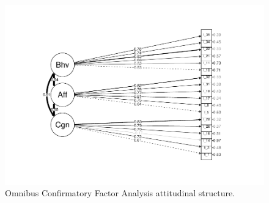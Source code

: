 \documentclass[
  man]{apa6}
\begin{document}
\begin{figure}
\centering
\includegraphics{EngagementPaper2_files/figure-latex/semplotatt-1.pdf}
\caption{\label{fig:semplotatt}Omnibus Confirmatory Factor Analysis attitudinal structure.}
\end{figure}
\end{document}
